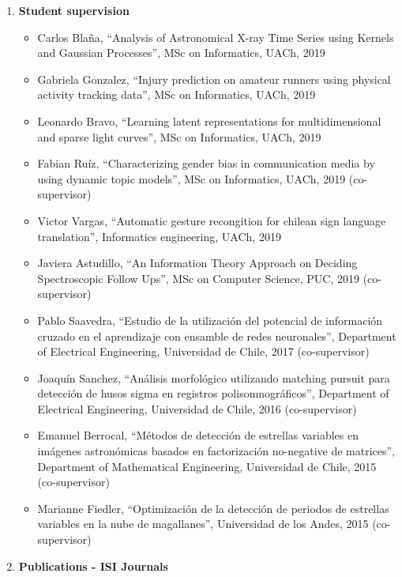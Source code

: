 \documentclass[letterpaper,11pt]{article}
\newcommand{\compactlist}{\setlength{\parskip}{0pt} \setlength{\leftskip}{2em}}
\begin{document}
\begin{enumerate}[I]
    \item \textbf{Student supervision}
    \begin{itemize}  \compactlist{}
        \item Carlos Bla\~na, ``Analysis of Astronomical X-ray Time Series using Kernels and Gaussian Processes'', MSc on Informatics, UACh, 2019
        \item Gabriela Gonzalez, ``Injury prediction on amateur runners using physical activity tracking data'', MSc on Informatics, UACh, 2019
        \item Leonardo Bravo, ``Learning latent representations for multidimensional and sparse light curves'', MSc on Informatics, UACh, 2019
        \item Fabian Ru\'iz,  ``Characterizing gender bias in communication media by using dynamic topic models'', MSc on Informatics, UACh, 2019 (co-supervisor)
        \item Victor Vargas, ``Automatic gesture recongition for chilean sign language translation'', Informatics engineering, UACh, 2019
        \item Javiera Astudillo, ``An Information Theory Approach on Deciding Spectroscopic Follow Ups'', MSc on Computer Science, PUC, 2019 (co-supervisor)
        \item Pablo Saavedra, ``Estudio de la utilizaci\'on del potencial de informaci\'on cruzado en el aprendizaje con ensamble de redes neuronales'', Department of Electrical Engineering, Universidad de Chile, 2017 (co-supervisor)
        \item Joaqu\'in Sanchez, ``An\'alisis morfol\'ogico utilizando matching pursuit para detecci\'on de husos sigma en registros polisomnogr\'aficos'', Department of Electrical Engineering, Universidad de Chile, 2016 (co-supervisor)
		\item Emanuel Berrocal, ``M\'etodos de detecci\'on de estrellas variables en im\'agenes astron\'omicas basados en factorizaci\'on no-negative de matrices'', Department of Mathematical Engineering, Universidad de Chile, 2015 (co-supervisor)
        \item Marianne Fiedler, ``Optimizaci\'on de la detecci\'on de periodos de estrellas variables en la nube de magallanes'', Universidad de los Andes, 2015 (co-supervisor)
		
		\end{itemize}
	
	
	
	\item \textbf{Publications - ISI Journals}


\end{enumerate}
\end{document}
